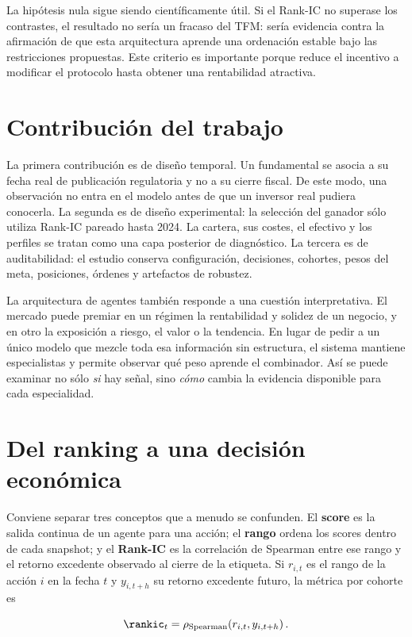 La hipótesis nula sigue siendo científicamente útil. Si el Rank-IC no superase los contrastes, el
resultado no sería un fracaso del TFM: sería evidencia contra la afirmación de que esta arquitectura
aprende una ordenación estable bajo las restricciones propuestas. Este criterio es importante porque
reduce el incentivo a modificar el protocolo hasta obtener una rentabilidad atractiva.

\section{Contribución del trabajo}

La primera contribución es de diseño temporal. Un fundamental se asocia a su fecha real de
publicación regulatoria y no a su cierre fiscal. De este modo, una observación no entra en el modelo
antes de que un inversor real pudiera conocerla. La segunda es de diseño experimental: la selección
del ganador sólo utiliza Rank-IC pareado hasta 2024. La cartera, sus costes, el efectivo y los
perfiles se tratan como una capa posterior de diagnóstico. La tercera es de auditabilidad: el
estudio conserva configuración, decisiones, cohortes, pesos del meta, posiciones, órdenes y
artefactos de robustez.

La arquitectura de agentes también responde a una cuestión interpretativa. El mercado puede premiar
en un régimen la rentabilidad y solidez de un negocio, y en otro la exposición a riesgo, el valor o
la tendencia. En lugar de pedir a un único modelo que mezcle toda esa información sin estructura,
el sistema mantiene especialistas y permite observar qué peso aprende el combinador. Así se puede
examinar no sólo \emph{si} hay señal, sino \emph{cómo} cambia la evidencia disponible para cada
especialidad.

\section{Del ranking a una decisión económica}

Conviene separar tres conceptos que a menudo se confunden. El \textbf{score} es la salida continua de
un agente para una acción; el \textbf{rango} ordena los scores dentro de cada snapshot; y el
\textbf{Rank-IC} es la correlación de Spearman entre ese rango y el retorno excedente observado al
cierre de la etiqueta. Si $r_{i,t}$ es el rango de la acción $i$ en la fecha $t$ y $y_{i,t+h}$ su
retorno excedente futuro, la métrica por cohorte es

\[
\rankic_t=\rho_{\mathrm{Spearman}}\!\left(r_{i,t}, y_{i,t+h}\right).
\]

